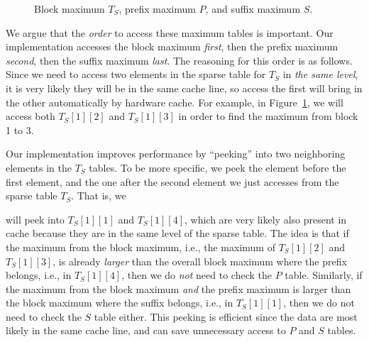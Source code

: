 

\begin{figure}[!thb]
  \centering {}  \caption{Block maximum $T_S$, prefix maximum $P$, and suffix
    maximum $S$.}
  \label{fig:compressed-sp-opt}
\end{figure}

We argue that the {\em order} to access these maximum tables is
important.  Our implementation accesses the block maximum {\em first},
then the prefix maximum {\em second}, then the suffix maximum {\em
last}.  The reasoning for this order is as follows.  Since we need to
access two elements in the sparse table for $T_S$ in {\em the same
level}, it is very likely they will be in the same cache line, so access
the first will bring in the other automatically by hardware cache.  For
example, in Figure~\ref{fig:compressed-sp-opt}, we will access both
$T_{S}[1][2]$ and $T_{S}[1][3]$ in order to find the maximum from block
1 to 3.

Our implementation improves performance by ``peeking'' into two
neighboring elements in the $T_{S}$ tables.  To be more specific, we
peek the element before the first element, and the one after the
second element we just accesses from the sparse table $T_S$.  That is, we 

will peek into $T_{S}[1][1]$ and $T_{S}[1][4]$, which are very likely
also present in cache because they are in the same level of the sparse
table.  The idea is that if the maximum from the block maximum, i.e.,
the maximum of $T_{S}[1][2]$ and $T_{S}[1][3]$, is already {\em
  larger} than the overall block maximum where the prefix belongs,
i.e., in $T_{S}[1][4]$, then we do {\em not} need to check the $P$
table.  Similarly, if the maximum from the block maximum {\em and} the
prefix maximum is larger than the block maximum where the suffix
belongs, i.e., in $T_{S}[1][1]$, then we do not need to check the $S$
table either.  This peeking is efficient since the data are most
likely in the same cache line, and can save unnecessary access to $P$
and $S$ tables.


